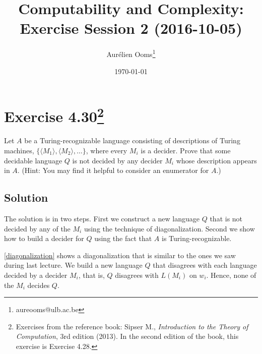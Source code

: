 \documentclass{article}
\title{Computability and Complexity:\\Exercise Session 2 (2016-10-05)}
\author{Aurélien Ooms\footnote{aureooms@ulb.ac.be}}
\date{\today}
\begin{document}
\maketitle
\tableofcontents

\section{Exercise 4.30\footnote{Exercises from the reference book: Sipser M.,
\emph{Introduction to the Theory of Computation}, 3rd edition (2013). In the
second edition of the book, this exercise is Exercise 4.28.}}

Let \(A\) be a Turing-recognizable language consisting of descriptions of
Turing machines,
\(\{\langle M_1 \rangle, \langle M_2 \rangle, \ldots \}\),
where every \(M_i\) is a decider. Prove that some decidable
language \(Q\) is not decided by any decider \(M_i\) whose description appears in
\(A\).
(Hint: You may find it helpful to consider an enumerator for \(A\).)

\subsection{Solution}

The solution is in two steps. First we construct a new language \(Q\) that is not
decided by any of the \(M_i\) using the technique of diagonalization. Second we
show how to build a decider for \(Q\) using the fact that \(A\) is
Turing-recognizable.

\ref{diagonalization} shows a diagonalization that
is similar to the ones we saw during last lecture. We build a new language \(Q\) that
disagrees with each language decided by a decider \(M_i\), that is, \(Q\) disagrees with
\(L(M_i)\) on \(w_i\). Hence, none of the \(M_i\) decides \(Q\).
\end{document}
